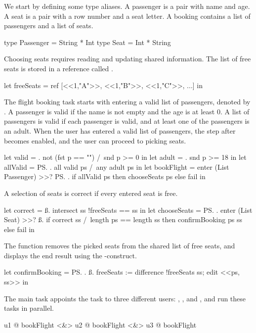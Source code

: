 \begin{example}
\label{exm:flight-booking}

We start by defining some type aliases.
A passenger is a pair with name and age.
A seat is a pair with a row number and a seat letter.
A booking contains a list of passengers and a list of seats.
\begin{TASK}
  type Passenger = String * Int
  type Seat = Int * String
\end{TASK}

Choosing seats requires reading and updating shared information.
The list of free seats is stored in a reference called .
\begin{TASK}
  let freeSeats = ref [<<1,"A">>, <<1,"B">>, <<1,"C">>, ...] in
\end{TASK}

The flight booking task starts with entering a valid list of passengers,
denoted by .
A passenger is valid if the name is not empty and the age is at least 0.
A list of passengers is valid if each passenger is valid, and at least one of the passengers is an adult.
When the user has entered a valid list of passengers, the step after  becomes enabled,
and the user can proceed to picking seats.
\begin{TASK}
  let valid = \p. not (fst p == "") /\ snd p >= 0 in
  let adult = \p. snd p >= 18 in
  let allValid = \ps. all valid ps /\ any adult ps in
  let bookFlight = enter (List Passenger) >>? \ps.
    if allValid ps then chooseSeats ps else fail in
\end{TASK}
A selection of seats is correct if every entered seat is free.
\begin{TASK}
  let correct = \ss. intersect ss !freeSeats == ss in
  let chooseSeats = \ps. enter (List Seat) >>? \ss.
    if correct ss /\ length ps == length ss
      then confirmBooking ps ss else fail in
\end{TASK}
The function  removes the picked seats from the shared list of free seats,
and displays the end result using the -construct.
\begin{TASK}
  let confirmBooking = \ps. \ss.
    freeSeats := difference !freeSeats ss; edit <<ps, ss>> in
\end{TASK}

The main task appoints the  task to three different users: , , and ,
and run these tasks in parallel.
\begin{TASK}
  u1 @ bookFlight <&> u2 @ bookFlight <&> u3 @ bookFlight
\end{TASK}

\end{example}



